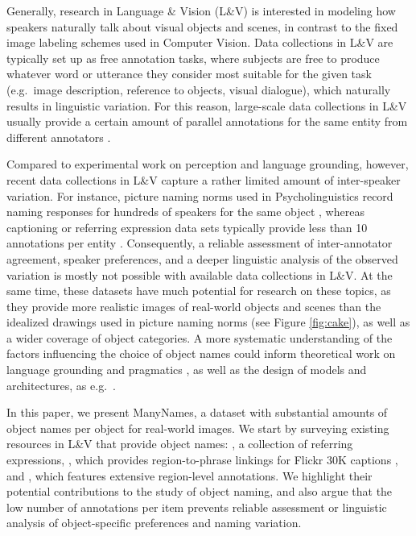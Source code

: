 Generally, research in Language \& Vision (L\&V) is interested in modeling how speakers naturally talk about visual objects and scenes, in contrast to the fixed image labeling schemes used in Computer Vision.
Data collections in L\&V are typically set up as free annotation tasks,  where subjects are free to produce whatever word or utterance they consider most suitable for the given task (e.g.\ image description, reference to objects, visual dialogue), which naturally results in linguistic variation.
For this reason, large-scale data collections in L\&V usually provide a certain amount of parallel annotations for the same entity from different annotators \cite{fangetal:2015,devlin:imcaqui,Kazemzadeh2014,mao15,vries2017guesswhat}.

Compared to experimental work on perception and language grounding, however, recent data collections in L\&V capture a rather limited amount of inter-speaker variation.
For instance, picture naming norms used in Psycholinguistics record naming responses for hundreds of speakers for the same object  \cite{snodgrass,rossion2004revisiting}, whereas captioning or referring expression data sets typically provide less than 10 annotations per entity \cite{devlin:imcaqui,Kazemzadeh2014,mao15}.
Consequently, a reliable assessment of inter-annotator agreement, speaker preferences, and a deeper linguistic analysis of the observed variation is mostly not possible with available data collections in  L\&V.
At the same time, these datasets have much potential for research on these topics, as they provide more realistic images of real-world objects and scenes than the idealized drawings used in picture naming norms (see Figure \ref{fig:cake}), as well as a wider coverage of object categories.
A more systematic understanding of the factors influencing the choice of object names could inform theoretical work on language grounding and pragmatics \cite{rohde2012communicating,graf2016animal}, as well as the design of models and architectures, as e.g.\ \cite{lazaridou-dinu-baroni:2015:ACL-IJCNLP,Ordonez:2016,zhao2017open}.

In this paper, we present ManyNames, a dataset with substantial amounts of object names per object for real-world images.
We start by surveying existing resources in L\&V that provide object names:  \cite{Yu2016}, a collection of referring expressions, \flickr \cite{plummer2015flickr30kentities}, which provides region-to-phrase linkings for Flickr 30K captions \cite{young:2014}, and \vgenome \cite{krishna2016visualgenome}, which features extensive region-level annotations. We highlight their potential contributions to the study of object naming, and also argue that the low number of annotations per item prevents reliable assessment or linguistic analysis of object-specific preferences and naming variation.

